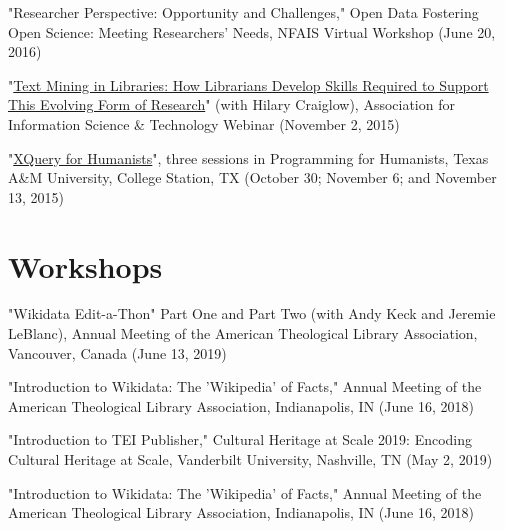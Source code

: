 \documentclass[10pt]{res} %
\begin{document}
\begin{resume}
\begin{hangparas}{.25in}{1}"Researcher Perspective: Opportunity and Challenges," Open Data Fostering Open Science: Meeting Researchers’ Needs, NFAIS Virtual Workshop (June 20, 2016)\end{hangparas}

\begin{hangparas}{.25in}{1}"\href{https://www.asist.org/events/webinars/text-mining-in-libraries/}{Text Mining in Libraries: How Librarians Develop Skills Required to Support This Evolving Form of Research}" (with Hilary Craiglow), Association for Information Science \& Technology Webinar (November 2, 2015)\end{hangparas}

\begin{hangparas}{.25in}{1}"\href{http://programming4humanists.tamu.edu/syllabus-fall-2015/}{XQuery for Humanists}", three sessions in Programming for Humanists, Texas A\&M University, College Station, TX (October 30; November 6; and November 13, 2015)\end{hangparas}

\section{Workshops}

\begin{hangparas}{.25in}{1}"Wikidata Edit-a-Thon" Part One and Part Two (with Andy Keck and Jeremie LeBlanc), Annual Meeting of the American Theological Library Association, Vancouver, Canada (June 13, 2019)\end{hangparas}

\begin{hangparas}{.25in}{1}"Introduction to Wikidata: The 'Wikipedia' of Facts," Annual Meeting of the American Theological Library Association, Indianapolis, IN (June 16, 2018)\end{hangparas}

\begin{hangparas}{.25in}{1}"Introduction to TEI Publisher," Cultural Heritage at Scale 2019: Encoding Cultural Heritage at Scale, Vanderbilt University, Nashville, TN (May 2, 2019)\end{hangparas}

\begin{hangparas}{.25in}{1}"Introduction to Wikidata: The 'Wikipedia' of Facts," Annual Meeting of the American Theological Library Association, Indianapolis, IN (June 16, 2018)\end{hangparas}


\end{resume}
\end{document}

